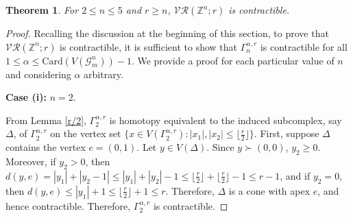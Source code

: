 \documentclass{amsart}
\newtheorem{theorem}{Theorem}[section]
\theoremstyle{definition}
\theoremstyle{remark}
\numberwithin{equation}{section}
\newcommand{\lk}{\mbox{\upshape lk}\,}
\newcommand{\D}{\Delta}
\newcommand{\f}{\lfloor\frac{r}{2}\rfloor}
\newcommand{\G}{\mathcal{G}}
\newcommand{\vr}[2]{\mathcal{VR}(#1;#2)}
\def\Z{{\mathbb{Z}}}
\begin{document}
\begin{theorem}\label{maintheorem}
	For $2\leq n\leq 5$ and $r \geq n$,  $\vr{\mathbb{Z}^n}{r}$ is contractible. 
\end{theorem}
\begin{proof}
	Recalling the discussion at the beginning of this section, to prove that  $\vr{\mathbb{Z}^n}{r}$ is contractible, it is sufficient to show that $\Gamma_{n}^{\alpha,r}$ is contractible for all $ 1 \leq \alpha \leq \mathrm{Card}(V(\G_{m}^n))-1$. We provide a proof for each particular value of $n$ and considering $\alpha$ arbitrary.
	
	\smallskip 
	
	\noindent\textbf{Case (i):} $n=2.$
	
	From Lemma \ref{r/2}, $\Gamma_{2}^{\alpha,r}$ is homotopy equivalent to the induced subcomplex, say $\D$, of $\Gamma_{2}^{\alpha,r}$ on the vertex set $\{x\in V(\Gamma_{2}^{\alpha,r}): |x_1|, |x_2| \leq \f \}$. First,  suppose $\D$ contains the vertex $e = (0,1)$. Let $y \in V(\Delta)$. Since $y\succ (0, 0)$, $y_2\geq 0$. Moreover, if $y_2>0$, then
	$d(y,e)=|y_1|+|y_2-1|\leq |y_1|+|y_2|-1\leq \f+\f-1\leq r-1$, and if $y_2=0$, then $d(y,e)\leq |y_1|+1\leq \f+1\leq r$. Therefore, $\D$ is a cone with apex $e$, and hence contractible. Therefore, $\Gamma_{2}^{\alpha,r}$ is contractible.
	

\end{proof}
\end{document}
